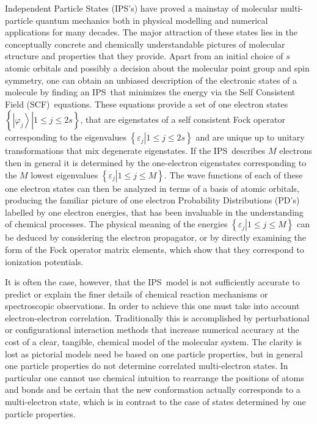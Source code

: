 \documentclass[aps,preprint]{revtex4}%
\begin{document}
Independent Particle States (IPS's) have proved a mainstay of molecular
multi-particle quantum mechanics both in physical modelling and numerical
applications for many decades. The major attraction of these states lies in
the conceptually concrete and chemically understandable pictures of molecular
structure and properties that they provide. Apart from an initial choice of
$s$ atomic orbitals and possibly a decision about the molecular point group
and spin symmetry, one can obtain an unbiased description of the electronic
states of a molecule by finding an IPS\ that minimizes the energy via the Self
Consistent Field (SCF)\ equations. These equations provide a set of one
electron states $\left\{  \left.  \left\vert \varphi_{j}\right\rangle
\right\vert 1\leq j\leq2s\right\}  $, that are eigenstates of a self
consistent Fock operator corresponding to the eigenvalues $\left\{  \left.
\varepsilon_{j}\right\vert 1\leq j\leq2s\right\}  $ and are unique up to
unitary transformations that mix degenerate eigenstates. If the IPS\ describes
$M$ electrons then in general it is determined by the one-electron eigenstates
corresponding to the $M$ lowest eigenvalues $\left\{  \left.  \varepsilon
_{j}\right\vert 1\leq j\leq M\right\}  $. The wave functions of each of these
one electron states can then be analyzed in terms of a basis of atomic
orbitals, producing the familiar picture of one electron Probability
Distributions (PD's) labelled by one electron energies, that has been
invaluable in the understanding of chemical processes. The physical meaning of
the energies $\left\{  \left.  \varepsilon_{j}\right\vert 1\leq j\leq
M\right\}  $ can be deduced by considering the electron propagator, or by
directly examining the form of the Fock operator matrix elements, which show
that they correspond to ionization potentials.

It is often the case, however, that the IPS\ model is not sufficiently
accurate to predict or explain the finer details of chemical reaction
mechanisms or spectroscopic observations. In order to achieve this one must
take into account electron-electron correlation. Traditionally this is
accomplished by perturbational or configurational interaction methods that
increase numerical accuracy at the cost of a clear, tangible, chemical model
of the molecular system. The clarity is lost as pictorial models need be based
on one particle properties, but in general one particle properties do not
determine correlated multi-electron states. In particular one cannot use
chemical intuition to rearrange the positions of atoms and bonds and be
certain that the new conformation actually corresponds to a multi-electron
state, which is in contrast to the case of states determined by one particle properties.
\end{document}
